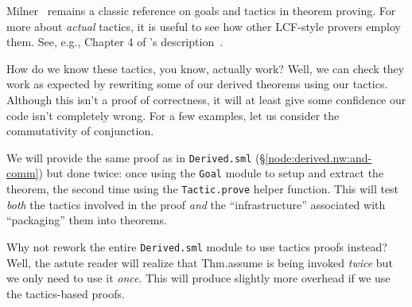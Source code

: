 \begin{node}[References]
Milner~\cite{milner1984use} remains a classic reference on goals and
tactics in theorem proving.
For more about \emph{actual} tactics, it is useful to see how other LCF-style
provers employ them. See, e.g., Chapter 4 of \HOL's description~\cite{HOLdescription}.
\end{node}

\begin{node}
How do we know these tactics, you know, actually work? Well, we can
check they work as expected by rewriting some of our derived theorems
using our tactics. Although this isn't a proof of correctness, it will
at least give some confidence our code isn't completely wrong. For a
few examples, let us consider the commutativity of conjunction.

We will provide the same proof as in \texttt{Derived.sml}
(\S\ref{node:derived.nw:and-comm}) but done twice: once using the
\texttt{Goal} module to setup and extract the theorem, the second time
using the \texttt{Tactic.prove} helper function. This will test
\emph{both} the tactics involved in the proof \emph{and} the
``infrastructure'' associated with ``packaging'' them into theorems.

Why not rework the entire \texttt{Derived.sml} module to use tactics
proofs instead? Well, the astute reader will realize that
{\Tt{}Thm.assume\nwendquote} is being invoked \emph{twice} but we only need to use
it \emph{once}. This will produce slightly more overhead if we use the
tactics-based proofs.
\end{node}

